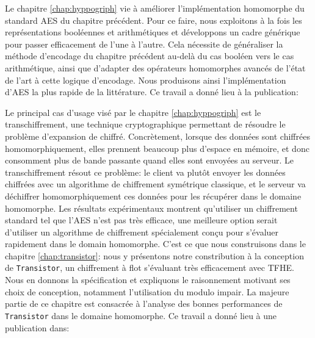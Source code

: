 \begin{center}
\end{center}

Le chapitre \ref{chap:hyppogriph} vie à améliorer l'implémentation homomorphe du standard \gls{AES} du chapitre précédent. Pour ce faire, nous exploitons à la fois les représentations booléennes et arithmétiques et développons un cadre générique pour passer efficacement de l’une à l’autre. Cela nécessite de généraliser la méthode d’encodage du chapitre précédent au-delà du cas booléen vers le cas arithmétique, ainsi que d'adapter des opérateurs homomorphes avancés de l'état de l'art à cette logique d'encodage. Nous produisons ainsi l'implémentation d’\gls{AES} la plus rapide de la littérature.
Ce travail a donné lieu à la publication:

\begin{center}
\end{center}

Le principal cas d'usage visé par le chapitre \ref{chap:hyppogriph} est le transchiffrement, une technique cryptographique permettant de résoudre le problème d'expansion de chiffré. Concrètement, lorsque des données sont chiffrées homomorphiquement, elles prennent beaucoup plus d'espace en mémoire, et donc consomment plus de bande passante quand elles sont envoyées au serveur. Le transchiffrement résout ce problème: le client va plutôt envoyer les données chiffrées avec un algorithme de chiffrement symétrique classique, et le serveur va déchiffrer homomorphiquement ces données pour les récupérer dans le domaine homomorphe. Les résultats expérimentaux montrent qu'utiliser un chiffrement standard tel que l'\gls{AES} n'est pas très efficace, une meilleure option serait d'utiliser un algorithme de chiffrement spécialement conçu pour s'évaluer rapidement dans le domain homomorphe. C'est ce que nous construisons dans le chapitre \ref{chap:transistor}: nous y présentons notre constribution à la conception de \texttt{Transistor}, un chiffrement à flot s'évaluant très efficacement avec \gls{TFHE}.  Nous en donnons la spécification et expliquons le raisonnement motivant ses choix de conception, notamment l'utilisation du modulo impair. La majeure partie de ce chapitre est consacrée à l’analyse des bonnes performances de \texttt{Transistor} dans le domaine homomorphe.
Ce travail a donné lieu à une publication dans:

\begin{center}
\end{center}

